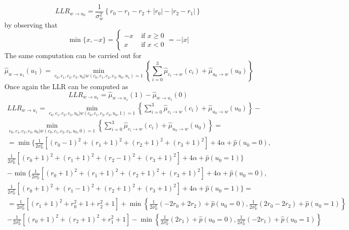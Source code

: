 \documentclass[10pt]{article}
\begin{document}
\begin{equation}\label{eq:llrmin0}
	LLR_{w \rightarrow u_0} = \frac{1}{\sigma_w^2}\left\{ r_0 - r_1 - r_2 + |r_0| - |r_2 - r_1| \right\}
\end{equation}
by observing that 
\begin{equation}
	\min\{x, -x\} = 
	\begin{cases}
		-x & \mbox{ if } x \ge 0 \\
		x & \mbox{ if } x < 0
	\end{cases} = 
	- |x|
\end{equation}
The same computation can be carried out for 
\begin{equation}
	\hat{\mu}_{w \rightarrow u_1}(u_1) = \min_{c_0, c_1, c_2, c_3, u_0 | w(c_0, c_1, c_2, c_3, u_0, u_1) = 1} 
		\left\{
			\sum_{i=0}^{3} \hat{\mu}_{c_i \rightarrow w}(c_i) + \hat{\mu}_{u_0 \rightarrow w}(u_0)
		\right\}
\end{equation}
Once again the LLR can be computed as
\begin{equation}
	LLR_{w \rightarrow u_1} = \hat{\mu}_{w \rightarrow u_1}(1) - \hat{\mu}_{w \rightarrow u_1}(0)
\end{equation}
\begin{multline}\label{eq:LLR2}
	LLR_{w \rightarrow u_1} = 
	\min_{c_0, c_1, c_2, c_3, u_0 | w(c_0, c_1, c_2, c_3, u_0, 1) = 1} 
		\left\{
			\sum_{i=0}^{3} \hat{\mu}_{c_i \rightarrow w}(c_i) + \hat{\mu}_{u_0 \rightarrow w}(u_0)
		\right\}
	- \\
	\min_{c_0, c_1, c_2, c_3, u_0 | w(c_0, c_1, c_2, c_3, u_0, 0) = 1}  
		\left\{
			\sum_{i=0}^{3} \hat{\mu}_{c_i \rightarrow w}(c_i) + \hat{\mu}_{u_0 \rightarrow w}(u_0)
		\right\} = \\
	 = \min
		\bigg\{
			\frac{1}{2\sigma_w^2}\left[(r_0-1)^2 + (r_1+1)^2 + (r_2+1)^2 + (r_3+1)^2\right] + 4\alpha + \hat{p}(u_0 = 0), \\
			\frac{1}{2\sigma_w^2}\left[(r_0+1)^2 + (r_1+1)^2 + (r_2-1)^2 + (r_3+1)^2\right] + 4\alpha + \hat{p}(u_0 = 1)
		\bigg\} \\
	 - \min
		\bigg\{
			\frac{1}{2\sigma_w^2}\left[(r_0+1)^2 + (r_1+1)^2 + (r_2+1)^2 + (r_3+1)^2\right] + 4\alpha + \hat{p}(u_0 = 0), \\
			\frac{1}{2\sigma_w^2}\left[(r_0+1)^2 + (r_1-1)^2 + (r_2+1)^2 + (r_3+1)^2\right] + 4\alpha + \hat{p}(u_0 = 1)
		\bigg\} = \\
	 = \frac{1}{2\sigma_w^2}\left[ (r_1+1)^2 + r_0^2 + 1 + r_2^2+1 \right] + \min\left\{ \frac{1}{2\sigma_w^2}(-2r_0 + 2r_2) + \hat{p}(u_0=0), \frac{1}{2\sigma_w^2}(2r_0 - 2r_2) + \hat{p}(u_0=1) \right\} \\
	- \frac{1}{2\sigma_w^2}\left[ (r_0+1)^2 + (r_2+1)^2 +r_1^2 + 1 \right] - \min\left\{ \frac{1}{2\sigma_w^2}(2r_1) + \hat{p}(u_0=0), \frac{1}{2\sigma_w^2}(- 2r_1) + \hat{p}(u_0=1) \right\}
\end{multline}
\end{document}
